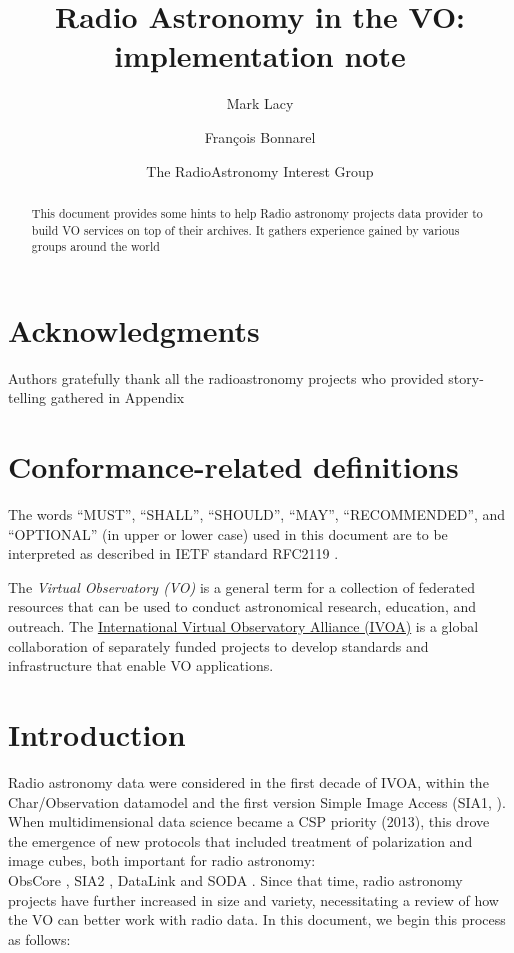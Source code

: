 \documentclass[11pt,a4paper]{ivoa}
\title{Radio Astronomy in the VO:\\ implementation note}
\author[https://wiki.ivoa.net/twiki/bin/view/IVOA/MarkLacy]{Mark Lacy}
\author[https://wiki.ivoa.net/twiki/bin/view/IVOA/FrancoisBonnarel]{Fran\c cois Bonnarel}
\author{The RadioAstronomy Interest Group}
\begin{document}
\begin{abstract}
	This document provides some hints to help Radio astronomy projects data provider to build VO services on top of their archives. It gathers experience gained by various groups around the world
\end{abstract}


\section*{Acknowledgments}

Authors gratefully thank all the radioastronomy projects  who provided story-telling gathered in Appendix

\section*{Conformance-related definitions}

The words ``MUST'', ``SHALL'', ``SHOULD'', ``MAY'', ``RECOMMENDED'', and
``OPTIONAL'' (in upper or lower case) used in this document are to be
interpreted as described in IETF standard RFC2119 \citep{std:RFC2119}.

The \emph{Virtual Observatory (VO)} is a
general term for a collection of federated resources that can be used
to conduct astronomical research, education, and outreach.
The \href{https://www.ivoa.net}{International
Virtual Observatory Alliance (IVOA)} is a global
collaboration of separately funded projects to develop standards and
infrastructure that enable VO applications.


\section{Introduction}

Radio astronomy data were considered in the first decade of IVOA, within the Char/Observation datamodel and the first version Simple Image Access (SIA1, \cite{std:SIAP}). When multidimensional data science became a CSP priority (2013), this drove the emergence of new protocols that included treatment of polarization and image cubes, both important for radio astronomy:\\ ObsCore \citep{std:OBSCORE}, SIA2 \citep{std:SIAV2} , DataLink \citep{2015ivoa.spec.0617D} and SODA \citep{std:SODA}. 
Since that time, radio astronomy projects have further increased in size and variety, necessitating a review of how the VO can better work with radio data. In this document, we begin this process as follows:
\end{document}
